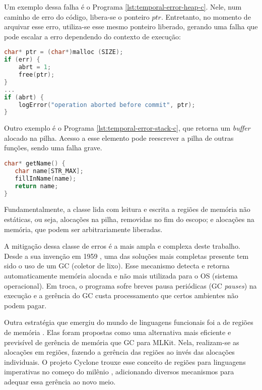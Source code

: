 Um exemplo dessa falha é o Programa \ref{lst:temporal-error-heap-c}. Nele, num caminho de erro do código, libera-se o ponteiro $ptr$. Entretanto, no momento de arquivar esse erro, utiliza-se esse mesmo ponteiro liberado, gerando uma falha que pode escalar a erro dependendo do contexto de execução:
\begin{lstlisting}[language=C, label={lst:temporal-error-heap-c}, caption=Exemplo de uma Falha Temporal na \emph{Heap}]
char* ptr = (char*)malloc (SIZE);  
if (err) {
	abrt = 1;  
	free(ptr);
}  
...  
if (abrt) {
	logError("operation aborted before commit", ptr);
}
\end{lstlisting}

Outro exemplo é o Programa \ref{lst:temporal-error-stack-c}, que retorna um \emph{buffer} alocado na pilha. Acesso a esse elemento pode reescrever a pilha de outras funções, sendo uma falha grave.

\begin{lstlisting}[language=C, label={lst:temporal-error-stack-c}, caption=Exemplo de uma Falha Temporal na Pilha]
char* getName() {
   char name[STR_MAX];  
   fillInName(name);  
   return name;
}
\end{lstlisting}

Fundamentalmente, a classe lida com leitura e escrita a regiões de memória não estáticas, ou seja, alocações na pilha, removidas no fim do escopo; e alocações na memória, que podem ser arbitrariamente liberadas.


\label{sec:mem-error:GC}
A mitigação dessa classe de erros é a mais ampla e complexa deste trabalho. Desde a sua invenção em 1959 \cite{GCSTART}, uma das soluções mais completas presente tem sido o uso de um GC (coletor de lixo). Esse mecanismo detecta e retorna automaticamente memória alocada e não mais utilizada para o OS (sistema operacional). Em troca, o programa sofre breves pausa periódicas (GC \emph{pauses}) na execução e a gerência do GC custa processamento que certos ambientes não podem pagar.

\label{sec:mem-error:MemReg}
Outra estratégia que emergiu do mundo de linguagens funcionais foi a de regiões de memória \cite{REGMEM}. Elas foram propostas como uma alternativa mais eficiente e previsível de gerência de memória que GC para MLKit. Nela, realizam-se as alocações em regiões, fazendo a gerência das regiões ao invés das alocações individuais. O projeto Cyclone trouxe esse conceito de regiões para linguagens imperativas no começo do milênio \cite{CYCLONEMEM}, adicionando diversos mecanismos para adequar essa gerência ao novo meio.

